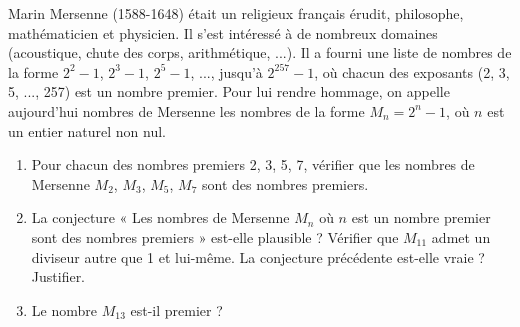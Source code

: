 
Marin Mersenne (1588-1648) était un religieux français érudit, philosophe, mathématicien et physicien. Il s’est intéressé à de nombreux domaines (acoustique, chute des corps, arithmétique, ...). Il a fourni une liste de nombres de la forme $2^2 - 1$, $2^3 - 1$, $2^5 - 1$, ..., jusqu’à $2^{257} - 1$, où chacun des exposants (2, 3, 5, ..., 257) est un nombre premier. Pour lui rendre hommage, on appelle aujourd'hui nombres de Mersenne les nombres de la forme $M_n = 2^n -1$, où $n$ est un entier naturel non nul.
\begin{enumerate}
\item Pour chacun des nombres premiers 2, 3, 5, 7, vérifier que les nombres de Mersenne $M_2$, $M_3$, $M_5$, $M_7$ sont des nombres premiers.
\item La conjecture « Les nombres de Mersenne $M_n$ où $n$ est un nombre premier sont des nombres premiers » est-elle plausible ? Vérifier que $M_{11}$ admet un diviseur autre que 1 et lui-même. La conjecture précédente est-elle vraie ? Justifier.
\item Le nombre  $M_{13}$ est-il premier ?


\end{enumerate}

